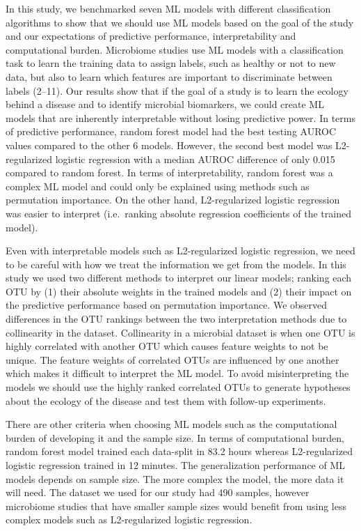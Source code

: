 \documentclass[11pt,]{article}
\begin{document}
In this study, we benchmarked seven ML models with different
classification algorithms to show that we should use ML models based on
the goal of the study and our expectations of predictive performance,
interpretability and computational burden. Microbiome studies use ML
models with a classification task to learn the training data to assign
labels, such as healthy or not to new data, but also to learn which
features are important to discriminate between labels (2--11). Our
results show that if the goal of a study is to learn the ecology behind
a disease and to identify microbial biomarkers, we could create ML
models that are inherently interpretable without losing predictive
power. In terms of predictive performance, random forest model had the
best testing AUROC values compared to the other 6 models. However, the
second best model was L2-regularized logistic regression with a median
AUROC difference of only 0.015 compared to random forest. In terms of
interpretability, random forest was a complex ML model and could only be
explained using methods such as permutation importance. On the other
hand, L2-regularized logistic regression was easier to interpret
(i.e.~ranking absolute regression coefficients of the trained model).

Even with interpretable models such as L2-regularized logistic
regression, we need to be careful with how we treat the information we
get from the models. In this study we used two different methods to
interpret our linear models; ranking each OTU by (1) their absolute
weights in the trained models and (2) their impact on the predictive
performance based on permutation importance. We observed differences in
the OTU rankings between the two interpretation methods due to
collinearity in the dataset. Collinearity in a microbial dataset is when
one OTU is highly correlated with another OTU which causes feature
weights to not be unique. The feature weights of correlated OTUs are
influenced by one another which makes it difficult to interpret the ML
model. To avoid misinterpreting the models we should use the highly
ranked correlated OTUs to generate hypotheses about the ecology of the
disease and test them with follow-up experiments.

There are other criteria when choosing ML models such as the
computational burden of developing it and the sample size. In terms of
computational burden, random forest model trained each data-split in
83.2 hours whereas L2-regularized logistic regression trained in 12
minutes. The generalization performance of ML models depends on sample
size. The more complex the model, the more data it will need. The
dataset we used for our study had 490 samples, however microbiome
studies that have smaller sample sizes would benefit from using less
complex models such as L2-regularized logistic regression.
\end{document}
